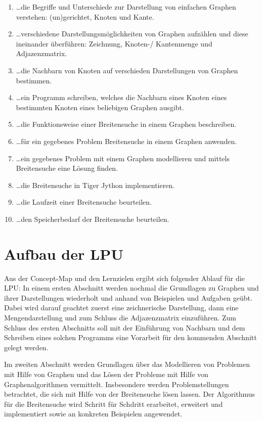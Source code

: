 \begin{enumerate}
\item \dots die Begriffe und Unterschiede zur Darstellung von einfachen Graphen verstehen: (un)gerichtet, Knoten und Kante.

\item \dots verschiedene Darstellungsmöglichkeiten von Graphen aufzählen und diese ineinander überführen: Zeichnung, Knoten-/ Kantenmenge und Adjazenzmatrix.

\item \dots die Nachbarn von Knoten auf verschieden Darstellungen von Graphen bestimmen. 

\item \dots ein Programm schreiben, welches die Nachbarn eines Knoten eines bestimmten Knoten eines beliebigen Graphen ausgibt.




\item \dots die Funktionsweise einer Breitensuche in einem Graphen beschreiben.
\item \dots für ein gegebenes Problem Breitensuche in einem Graphen anwenden.
\item \dots ein gegebenes Problem mit einem Graphen modellieren und mittels Breitensuche eine Lösung finden.
\item \dots die Breitensuche in Tiger Jython implementieren.
\item \dots die Laufzeit einer Breitensuche beurteilen.
\item \dots den Speicherbedarf der Breitensuche beurteilen.


\end{enumerate}


\section{Aufbau der LPU}

Aus der Concept-Map und den Lernzielen ergibt sich folgender Ablauf für die LPU:
In einem ersten Abschnitt werden nochmal die Grundlagen zu Graphen und ihrer Darstellungen wiederholt und anhand von Beispielen und Aufgaben geübt. 
Dabei wird darauf geachtet zuerst eine zeichnerische Darstellung, dann eine Mengendarstellung und zum Schluss die Adjazenzmatrix einzuführen. 
Zum Schluss des ersten Abschnitts soll mit der Einführung von Nachbarn und dem Schreiben eines solchen Programms eine Vorarbeit für den kommenden Abschnitt gelegt werden.

Im zweiten Abschnitt werden Grundlagen \"uber das Modellieren von Problemen mit Hilfe von Graphen und das L\"osen der Probleme mit Hilfe von Graphenalgorithmen vermittelt. Insbesondere werden Problemstellungen betrachtet, die sich mit Hilfe von der Breitensuche l\"osen lassen. Der Algorithmus f\"ur die Breitensuche wird Schritt f\"ur Schdritt erarbeitet, erweitert und implementiert sowie an konkreten Beispielen angewendet.
